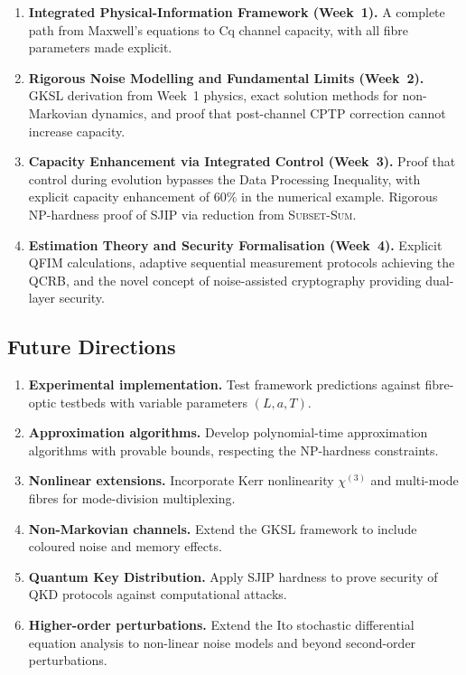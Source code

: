 \documentclass[12pt,a4paper]{article}
\theoremstyle{definition}
\theoremstyle{plain}
\begin{document}
\begin{enumerate}[leftmargin=*, label=(\arabic*)]
  \item \textbf{Integrated Physical-Information Framework (Week~1).} A complete path
    from Maxwell's equations to Cq channel capacity, with all fibre parameters made
    explicit.

  \item \textbf{Rigorous Noise Modelling and Fundamental Limits (Week~2).} GKSL
    derivation from Week~1 physics, exact solution methods for non-Markovian dynamics,
    and proof that post-channel CPTP correction cannot increase capacity.

  \item \textbf{Capacity Enhancement via Integrated Control (Week~3).} Proof that
    control during evolution bypasses the Data Processing Inequality, with explicit
    capacity enhancement of 60\% in the numerical example. Rigorous NP-hardness proof
    of SJIP via reduction from \textsc{Subset-Sum}.

  \item \textbf{Estimation Theory and Security Formalisation (Week~4).} Explicit
    QFIM calculations, adaptive sequential measurement protocols achieving the QCRB,
    and the novel concept of noise-assisted cryptography providing dual-layer security.
\end{enumerate}

\subsection{Future Directions}

\begin{enumerate}[leftmargin=*, label=(\arabic*)]
  \item \textbf{Experimental implementation.} Test framework predictions against
    fibre-optic testbeds with variable parameters $(L,a,T)$.
  \item \textbf{Approximation algorithms.} Develop polynomial-time approximation
    algorithms with provable bounds, respecting the NP-hardness constraints.
  \item \textbf{Nonlinear extensions.} Incorporate Kerr nonlinearity $\chi^{(3)}$ and
    multi-mode fibres for mode-division multiplexing.
  \item \textbf{Non-Markovian channels.} Extend the GKSL framework to include coloured
    noise and memory effects.
  \item \textbf{Quantum Key Distribution.} Apply SJIP hardness to prove security of
    QKD protocols against computational attacks.
  \item \textbf{Higher-order perturbations.} Extend the Ito stochastic differential
    equation analysis to non-linear noise models and beyond second-order perturbations.
\end{enumerate}
\end{document}
